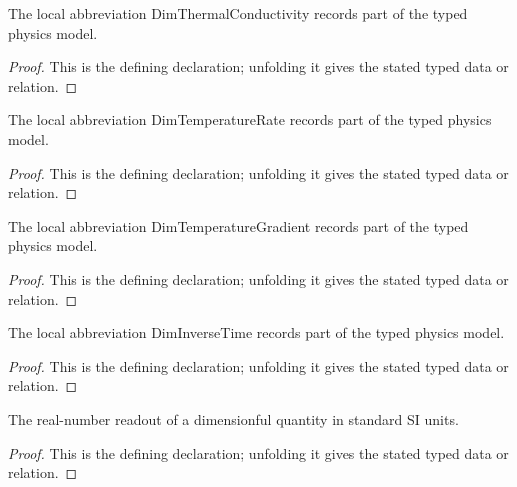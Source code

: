 \begin{definition}[DimThermalConductivity]
  \label{decl:physics:IPhO_2026_4_C_6:DimThermalConductivity}
  The local abbreviation DimThermalConductivity records part of the typed physics model.
\end{definition}
\begin{proof}
  This is the defining declaration; unfolding it gives the stated typed data or relation.
\end{proof}

\begin{definition}[DimTemperatureRate]
  \label{decl:physics:IPhO_2026_4_C_6:DimTemperatureRate}
  The local abbreviation DimTemperatureRate records part of the typed physics model.
\end{definition}
\begin{proof}
  This is the defining declaration; unfolding it gives the stated typed data or relation.
\end{proof}

\begin{definition}[DimTemperatureGradient]
  \label{decl:physics:IPhO_2026_4_C_6:DimTemperatureGradient}
  The local abbreviation DimTemperatureGradient records part of the typed physics model.
\end{definition}
\begin{proof}
  This is the defining declaration; unfolding it gives the stated typed data or relation.
\end{proof}

\begin{definition}[DimInverseTime]
  \label{decl:physics:IPhO_2026_4_C_6:DimInverseTime}
  The local abbreviation DimInverseTime records part of the typed physics model.
\end{definition}
\begin{proof}
  This is the defining declaration; unfolding it gives the stated typed data or relation.
\end{proof}

\begin{definition}[siReadout]
  \label{decl:physics:IPhO_2026_4_C_6:siReadout}
  The real-number readout of a dimensionful quantity in standard SI units.
\end{definition}
\begin{proof}
  This is the defining declaration; unfolding it gives the stated typed data or relation.
\end{proof}

